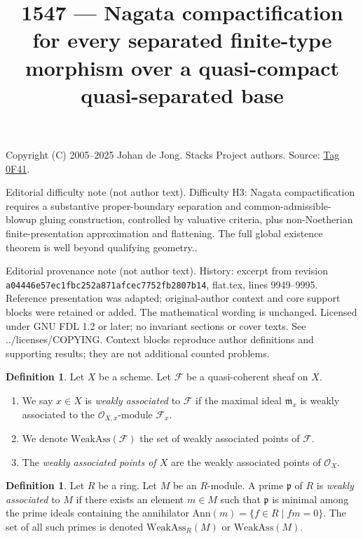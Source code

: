 \documentclass{amsart}
\theoremstyle{plain}
\theoremstyle{definition}
\newtheorem{definition}[subsection]{Definition}
\theoremstyle{remark}
\numberwithin{equation}{subsection}
\begin{document}
\title[Stacks Project, Tag 0F41]{1547 --- Nagata compactification for every separated finite-type morphism over a quasi-compact quasi-separated base}
\maketitle
\noindent Copyright (C) 2005--2025 Johan de Jong. Stacks Project authors. Source: \href{https://stacks.math.columbia.edu/tag/0F41}{Tag 0F41}.

\noindent Editorial difficulty note (not author text). Difficulty H3: Nagata compactification requires a substantive proper-boundary separation and common-admissible-blowup gluing construction, controlled by valuative criteria, plus non-Noetherian finite-presentation approximation and flattening. The full global existence theorem is well beyond qualifying geometry..

\noindent Editorial provenance note (not author text). History: excerpt from revision \texttt{a0444\allowbreak 6e57e\allowbreak c1fbc\allowbreak 252a8\allowbreak 71afc\allowbreak ec775\allowbreak 2fb28\allowbreak 07b14}, flat.tex, lines 9949--9995. Reference presentation was adapted; original-author context and core support blocks were retained or added. The mathematical wording is unchanged. Licensed under GNU FDL 1.2 or later; no invariant sections or cover texts. See ../licenses/COPYING. Context blocks reproduce author definitions and supporting results; they are not additional counted problems.

\begin{definition}
\label{divisors-definition-weakly-associated}
Let $X$ be a scheme.
Let $\mathcal{F}$ be a quasi-coherent sheaf on $X$.
\begin{enumerate}
\item We say $x \in X$ is {\it weakly associated} to $\mathcal{F}$
if the maximal ideal $\mathfrak m_x$ is weakly associated to the
$\mathcal{O}_{X, x}$-module $\mathcal{F}_x$.
\item We denote $\text{WeakAss}(\mathcal{F})$ the set of weakly associated
points of $\mathcal{F}$.
\item The {\it weakly associated points of $X$} are the weakly associated
points of $\mathcal{O}_X$.
\end{enumerate}
\end{definition}

\begin{definition}
\label{algebra-definition-weakly-associated}
Let $R$ be a ring. Let $M$ be an $R$-module.
A prime $\mathfrak p$ of $R$ is {\it weakly associated} to $M$
if there exists an element $m \in M$ such that $\mathfrak p$ is minimal
among the prime ideals containing the annihilator
$\text{Ann}(m) = \{f \in R \mid fm = 0\}$.
The set of all such primes is denoted $\text{WeakAss}_R(M)$
or $\text{WeakAss}(M)$.
\end{definition}
\end{document}

